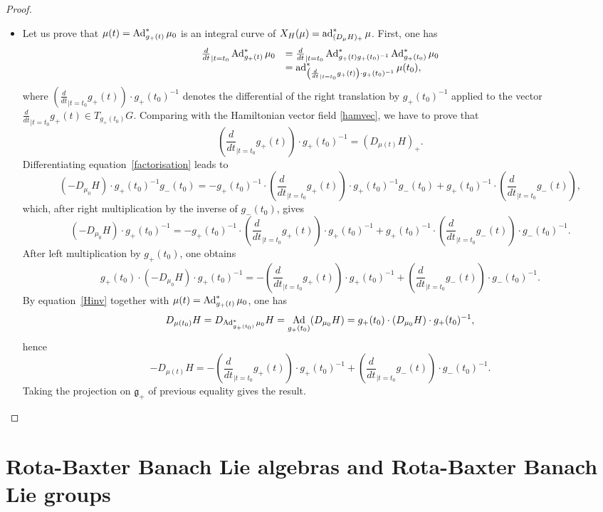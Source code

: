 \documentclass[a4paper,12pt,reqno]{amsart}%
\theoremstyle{definition}
\theoremstyle{remark}
\numberwithin{theorem}{section}
\numberwithin{equation}{section}
\newcommand{\1}{{\bf 1}}
\DeclareMathOperator{\ad}{\textnormal{ad}}
\DeclareMathOperator{\Ad}{\textnormal{Ad}}
\newcommand{\g}{{\mathfrak g}}
\begin{document}
\begin{proof}
\begin{itemize}
     \item Let us prove that $\mu(t) = \Ad^*_{g_+(t)}\mu_0$ is an integral curve of $X_H(\mu) =  \ad^*_{(D_\mu H)_+}\mu$. First, one has
    \[
    \begin{array}{ll}
    \frac{d}{dt}_{| t= t_0}\Ad^*_{g_+(t)}\mu_0& = \frac{d}{dt}_{| t= t_0}\Ad^*_{g_+(t)g_+(t_0)^{-1}}\Ad^*_{g_+(t_0)}\mu_0\\
    &   = \ad^*_{\left(\frac{d}{dt}_{|t = t_0}{g_+}(t)\right)\cdot g_+(t_0)^{-1}}\mu(t_0),
    \end{array}
    \]
    where $\left(\frac{d}{dt}_{|t = t_0}{g_+}(t)\right)\cdot g_+(t_0)^{-1}$ denotes the differential of the right translation by $g_+(t_0)^{-1}$ applied to the vector $\frac{d}{dt}_{|t = t_0}{g_+}(t)\in T_{g_+(t_0)}G$.
 Comparing with the Hamiltonian vector field \eqref{hamvec}, we have to prove that 
 \[
 \left(\frac{d}{dt}_{|t = t_0}{g_+}(t)\right)\cdot g_+(t_0)^{-1} = (D_{\mu(t)} H)_+.
 \]
    Differentiating equation~\eqref{factorisation}
   leads to 
   \[
    (-D_{\mu_0}H)\cdot g_+(t_0)^{-1} g_-(t_0) = -g_+(t_0)^{-1}\cdot \left(\frac{d}{dt}_{|t = t_0}g_+(t)\right)\cdot  g_+(t_0)^{-1}g_-(t_0) + g_+(t_0)^{-1}  \cdot \left(\frac{d}{dt}_{|t = t_0}g_-(t)\right),
   \]
   which, after right multiplication by the inverse of $g_-(t_0)$, gives
   \[
    (-D_{\mu_0}H)\cdot g_+(t_0)^{-1} = -g_+(t_0)^{-1}\cdot \left(\frac{d}{dt}_{|t = t_0}g_+(t)\right)\cdot g_+(t_0)^{-1} + g_+(t_0)^{-1}\cdot \left(\frac{d}{dt}_{|t = t_0}g_-(t)\right)\cdot g_-(t_0)^{-1}.
   \]
   After left multiplication by $g_+(t_0)$, one obtains
   \[
    g_+(t_0)\cdot (-D_{\mu_0}H)\cdot g_+(t_0)^{-1} = - \left(\frac{d}{dt}_{|t = t_0}g_+(t)\right)\cdot g_+(t_0)^{-1} + \left(\frac{d}{dt}_{|t = t_0}g_-(t)\right)\cdot g_-(t_0)^{-1}.
   \]
   By equation~\eqref{Hinv} 
    together with $\mu(t) = \Ad^*_{g_+(t)}\mu_0$, one has
    \[
    D_{\mu(t_0)} H = D_{\Ad^*_{g_+(t_0)}\mu_0} H = \Ad_{g_+(t_0)}(D_{\mu_0} H) =  g_+(t_0)\cdot (D_{\mu_0}H)\cdot g_+(t_0)^{-1} ,
    \]
    hence 
    \[
    -D_{\mu(t)} H = - \left(\frac{d}{dt}_{|t = t_0}g_+(t)\right)\cdot g_+(t_0)^{-1} + \left(\frac{d}{dt}_{|t = t_0}g_-(t)\right)\cdot g_-(t_0)^{-1}.
    \]
    Taking the projection on $\g_+$ of previous equality gives the result.
    \end{itemize}
\end{proof}




\section{Rota-Baxter Banach Lie algebras and Rota-Baxter Banach Lie groups}\label{sec:B}
\end{document}

